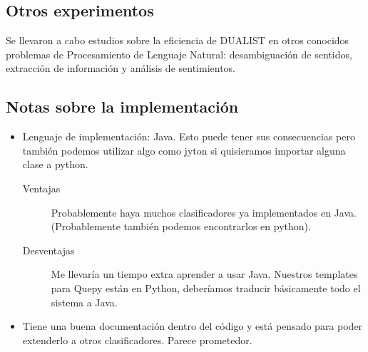\documentclass[11pt,spanish]{article}
\begin{document}
\subsection{Otros experimentos}
Se llevaron a cabo estudios sobre la eficiencia de DUALIST en otros conocidos
problemas de Procesamiento de Lenguaje Natural: desambiguación de sentidos,
extracción de información y análisis de sentimientos.

\subsection{Notas sobre la implementación}
\begin{itemize}
    \item Lenguaje de implementación: Java. Esto puede tener sus consecuencias
    pero también podemos utilizar algo como jyton si quisieramos importar
    alguna clase a python.
    \begin{description}
        \item[Ventajas] Probablemente haya muchos clasificadores ya
        implementados en Java. (Probablemente también podemos encontrarlos
        en python).
        \item[Desventajas] Me llevaría un tiempo extra aprender a usar Java.
        Nuestros templates para Quepy están en Python, deberíamos traducir
        básicamente todo el sistema a Java.
    \end{description}
    \item Tiene una buena documentación dentro del código y está pensado para
    poder extenderlo a otros clasificadores. Parece prometedor.
\end{itemize}
\end{document}
